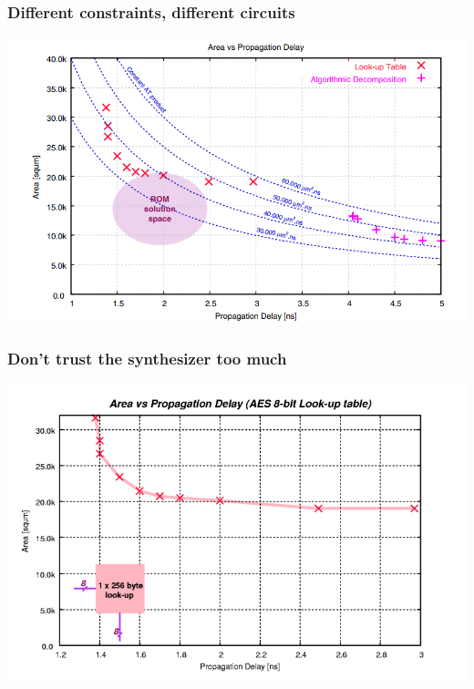 \documentclass[compress]{beamer}
\begin{document}
\begin{frame}
	\frametitle{Different constraints, different circuits}
	\begin{center}
		\includegraphics[width=\textwidth]{synth_1}
	\end{center}
\end{frame}
\begin{frame}
	\frametitle{Don’t trust the synthesizer too much}
	\begin{center}
		\includegraphics[width=\textwidth]{synthesizer1}
	\end{center}
\end{frame}
\end{document}
